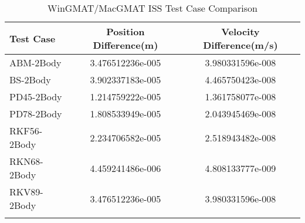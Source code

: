 \begin{table}[htbp!]
\centering
\caption{ WinGMAT/MacGMAT ISS Test Case Comparison}
      \begin{tabular}{lcc}
      \hline\hline
          Test Case & Position Difference(m) & Velocity Difference(m/s) \\
         \hline
         ABM-2Body & 3.476512236e-005 & 3.980331596e-008 \\
         BS-2Body & 3.902337183e-005 & 4.465750423e-008 \\
         PD45-2Body & 1.214759222e-005 & 1.361758077e-008 \\
         PD78-2Body & 1.808533949e-005 & 2.043945469e-008 \\
         RKF56-2Body & 2.234706582e-005 & 2.518943482e-008 \\
         RKN68-2Body & 4.459241486e-006 & 4.808133777e-009 \\
         RKV89-2Body & 3.476512236e-005 & 3.980331596e-008 \\
      \hline\hline
      \label{Table: ISS WinGMAT-MacGMAT Table} 
\end{tabular}
\end{table}
